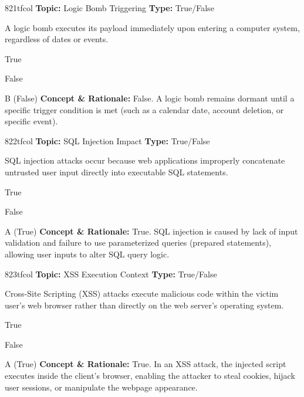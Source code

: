 \begin{qcard}{821}{tfcol}
\textcolor{darkslate!75}{\small\textbf{Topic:} Logic Bomb Triggering \hfill \textbf{Type:} True/False}\vspace{0.4em}\par
A logic bomb executes its payload immediately upon entering a computer system, regardless of dates or events.
\begin{qoptions}
\item True
\item False
\end{qoptions}
\end{qcard}
\nopagebreak
\begin{explainbox}{B (False)}
\textbf{Concept \& Rationale:} False. A logic bomb remains dormant until a specific trigger condition is met (such as a calendar date, account deletion, or specific event).
\end{explainbox}

\begin{qcard}{822}{tfcol}
\textcolor{darkslate!75}{\small\textbf{Topic:} SQL Injection Impact \hfill \textbf{Type:} True/False}\vspace{0.4em}\par
SQL injection attacks occur because web applications improperly concatenate untrusted user input directly into executable SQL statements.
\begin{qoptions}
\item True
\item False
\end{qoptions}
\end{qcard}
\nopagebreak
\begin{explainbox}{A (True)}
\textbf{Concept \& Rationale:} True. SQL injection is caused by lack of input validation and failure to use parameterized queries (prepared statements), allowing user inputs to alter SQL query logic.
\end{explainbox}

\begin{qcard}{823}{tfcol}
\textcolor{darkslate!75}{\small\textbf{Topic:} XSS Execution Context \hfill \textbf{Type:} True/False}\vspace{0.4em}\par
Cross-Site Scripting (XSS) attacks execute malicious code within the victim user's web browser rather than directly on the web server's operating system.
\begin{qoptions}
\item True
\item False
\end{qoptions}
\end{qcard}
\nopagebreak
\begin{explainbox}{A (True)}
\textbf{Concept \& Rationale:} True. In an XSS attack, the injected script executes inside the client's browser, enabling the attacker to steal cookies, hijack user sessions, or manipulate the webpage appearance.
\end{explainbox}

